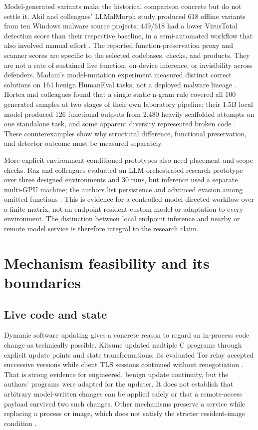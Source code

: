 \documentclass[11pt,letterpaper]{article}
\begin{document}
Model-generated variants make the historical comparison concrete but do not settle it. Akil and colleagues' LLMalMorph study produced 618 offline variants from ten Windows malware source projects; 449/618 had a lower VirusTotal detection score than their respective baseline, in a semi-automated workflow that also involved manual effort \cite{llmalmorph}. The reported function-preservation proxy and scanner scores are specific to the selected codebases, checks, and products. They are not a rate of sustained live function, on-device inference, or invisibility across defenders. Madani's model-mutation experiment measured distinct correct solutions on 164 benign HumanEval tasks, not a deployed malware lineage \cite{madani}. Hortea and colleagues found that a single static n-gram rule covered all 100 generated samples at two stages of their own laboratory pipeline; their 1.5B local model produced 126 functional outputs from 2,480 heavily scaffolded attempts on one standalone task, and some apparent diversity represented broken code \cite{hortea}. These counterexamples show why structural difference, functional preservation, and detector outcome must be measured separately.

More explicit environment-conditioned prototypes also need placement and scope checks. Raz and colleagues evaluated an LLM-orchestrated research prototype over three designed environments and 30 runs, but inference used a separate multi-GPU machine; the authors list persistence and advanced evasion among omitted functions \cite{raz}. This is evidence for a controlled model-directed workflow over a finite matrix, not an endpoint-resident custom model or adaptation to every environment. The distinction between local endpoint inference and nearby or remote model service is therefore integral to the research claim.

\section{Mechanism feasibility and its boundaries}\label{sec:mechanism}

\subsection{Live code and state}

Dynamic software updating gives a concrete reason to regard an in-process code change as technically possible. Kitsune updated multiple C programs through explicit update points and state transformations; its evaluated Tor relay accepted successive versions while client TLS sessions continued without renegotiation \cite{kitsune}. That is strong evidence for engineered, benign update continuity, but the authors' programs were adapted for the updater. It does not establish that arbitrary model-written changes can be applied safely or that a remote-access payload survived two such changes. Other mechanisms preserve a service while replacing a process or image, which does not satisfy the stricter resident-image condition \cite{proteos}.
\end{document}
